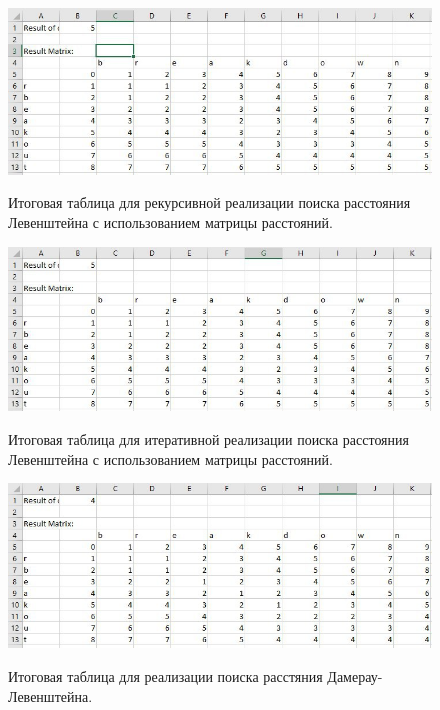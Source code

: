 \documentclass[12pt]{report}
\begin{document}
\begin{figure}
\includegraphics[width=\linewidth]{inc/img/RecMatAnsw.png}{\newline \textbf{}}
\captionsetup{justification=centering}
	\caption{Итоговая таблица для рекурсивной реализации поиска расстояния Левенштейна с использованием матрицы расстояний.}
	\label{TD:3}
\end{figure}

\begin{figure}
\includegraphics[width=\linewidth]{inc/img/IterMatAnsw.png}{\newline \textbf{}}
\captionsetup{justification=centering}
	\caption{Итоговая таблица для итеративной реализации поиска расстояния Левенштейна с использованием матрицы расстояний.}
	\label{TD:4}
\end{figure}

\begin{figure}
\includegraphics[width=\linewidth]{inc/img/DamLevAnsw.png}{\newline \textbf{}}
\captionsetup{justification=centering}
	\caption{Итоговая таблица для реализации поиска расстяния Дамерау-Левенштейна.}
	\label{TD:5}
\end{figure}
\end{document}
